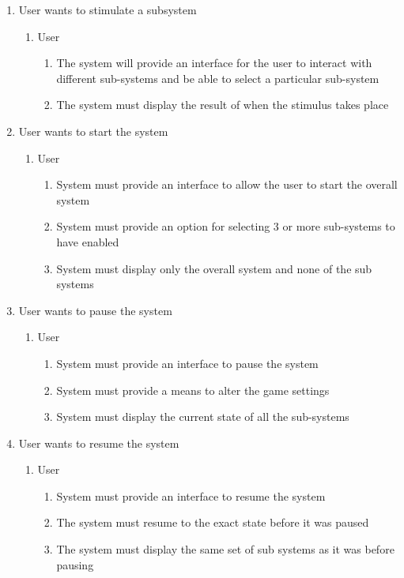 \documentclass[12pt, titlepage]{article}
\begin{document}
\begin{enumerate}[{BE}1.]
	\item User wants to stimulate a subsystem
	\begin{enumerate}[{VP4}.1]
		\item User
			\begin{enumerate}
				\item The system will provide an interface for the user to interact with different sub-systems and be able to select a particular sub-system
				\item The system must display the result of when the stimulus takes place
			\end{enumerate}
	\end{enumerate}
	
	\item User wants to start the system
	\begin{enumerate}[{VP5}.1]
		\item User
			\begin{enumerate}
				\item System must provide an interface to allow the user to start the overall system
				\item System must provide an option for selecting 3 or more sub-systems to have enabled
				\item System must display only the overall system and none of the sub systems
			\end{enumerate}
	\end{enumerate}
	
	\item User wants to pause the system
	\begin{enumerate}[{VP6}.1]
		\item User
			\begin{enumerate}
				\item System must provide an interface to pause the system
				\item System must provide a means to alter the game settings
				\item System must display the current state of all the sub-systems
			\end{enumerate}
	\end{enumerate}
	
	\item User wants to resume the system
	\begin{enumerate}[{VP7}.1]
		\item User
			\begin{enumerate}
				\item System must provide an interface to resume the system
				\item The system must resume to the exact state before it was paused
				\item The system must display the same set of sub systems as it was before pausing
			\end{enumerate}
	\end{enumerate}
	

\end{enumerate}
\end{document}
